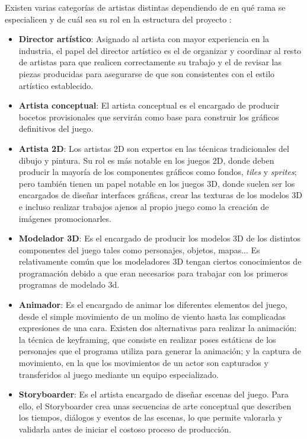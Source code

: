 Existen varias categorías de artistas distintas dependiendo de en qué rama se especialicen y de cuál sea su rol en la estructura del proyecto \cite{development_and_production}:
\begin{itemize}
\item \textbf{Director artístico}: Asignado al artista con mayor experiencia en la industria, el papel del director artístico es el de organizar y coordinar al resto de artistas para que realicen correctamente su trabajo y el de revisar las piezas producidas para asegurarse de que son consistentes con el estilo artístico establecido.
\item \textbf{Artista conceptual}: El artista conceptual es el encargado de producir bocetos provisionales que servirán como base para construir los gráficos definitivos del juego.
\item \textbf{Artista 2D}: Los artistas 2D son expertos en las técnicas tradicionales del dibujo y pintura.  Su rol es más notable en los juegos 2D, donde deben producir la mayoría de los componentes gráficos como fondos, \textit{tiles} y \textit{sprites}; pero también tienen un papel notable en los juegos 3D, donde suelen ser los encargados de diseñar interfaces gráficas, crear las texturas de los modelos 3D e incluso realizar trabajos ajenos al propio juego como la creación de imágenes promocionarles.
\item \textbf{Modelador 3D}: Es el encargado de producir los modelos 3D de los distintos componentes del juego tales como personajes, objetos, mapas...  Es relativamente común que los modeladores 3D tengan ciertos conocimientos de programación debido a que eran necesarios para trabajar con los primeros programas de modelado 3d.
\item \textbf{Animador}: Es el encargado de animar los diferentes elementos del juego, desde el simple movimiento de un molino de viento hasta las complicadas expresiones de una cara. Existen dos alternativas para realizar la animación: la técnica de keyframing, que consiste en realizar poses estáticas de los personajes que el programa utiliza para generar la animación; y la captura de movimiento, en la que los movimientos de un actor son capturados y transferidos al juego mediante un equipo especializado.
\item \textbf{Storyboarder}: Es el artista encargado de diseñar escenas del juego. Para ello, el Storyboarder crea unas secuencias de arte conceptual que describen los tiempos, diálogos y eventos de las escenas, lo que permite valorarla y validarla antes de iniciar el costoso proceso de producción.
\end{itemize}

